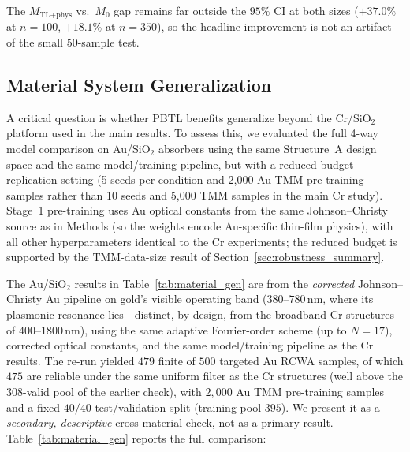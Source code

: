 \documentclass[a4paper,fleqn]{cas-sc}
\newcommand{\Mzero}{M_0}
\newcommand{\Mtlphys}{M_\text{TL+phys}}
\begin{document}
The $\Mtlphys$ vs.\ $\Mzero$ gap remains far outside the $95\%$ CI at both sizes ($+37.0\%$ at $n=100$, $+18.1\%$ at $n=350$), so the headline improvement is not an artifact of the small $50$-sample test.


\subsection{Material System Generalization}
\label{sec:material_generalization}

A critical question is whether PBTL benefits generalize beyond the Cr/SiO$_2$ platform used in the main results. To assess this, we evaluated the full 4-way model comparison on Au/SiO$_2$ absorbers using the same Structure~A design space and the same model/training pipeline, but with a reduced-budget replication setting (5 seeds per condition and 2{,}000 Au TMM pre-training samples rather than 10 seeds and 5{,}000 TMM samples in the main Cr study). Stage~1 pre-training uses Au optical constants from the same Johnson--Christy source as in Methods (so the weights encode Au-specific thin-film physics), with all other hyperparameters identical to the Cr experiments; the reduced budget is supported by the TMM-data-size result of Section~\ref{sec:robustness_summary}.

The Au/SiO$_2$ results in Table~\ref{tab:material_gen} are from the \emph{corrected} Johnson--Christy Au pipeline on gold's visible operating band ($380$--$780$\,nm, where its plasmonic resonance lies---distinct, by design, from the broadband Cr structures of $400$--$1800$\,nm), using the same adaptive Fourier-order scheme (up to $N{=}17$), corrected optical constants, and the same model/training pipeline as the Cr results. The re-run yielded $479$ finite of $500$ targeted Au RCWA samples, of which $475$ are reliable under the same uniform filter as the Cr structures (well above the $308$-valid pool of the earlier check), with $2{,}000$ Au TMM pre-training samples and a fixed $40/40$ test/validation split (training pool $395$). We present it as a \emph{secondary, descriptive} cross-material check, not as a primary result. Table~\ref{tab:material_gen} reports the full comparison:
\end{document}
